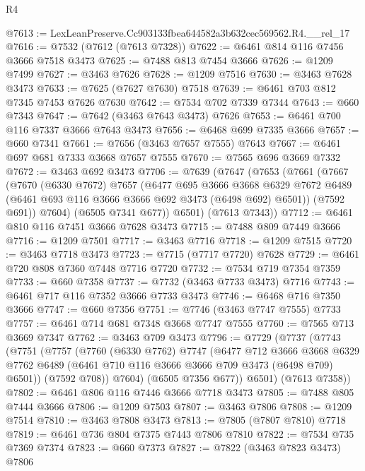 \begin{lexlean}{R4}
\begin{coremodule}
@7613 := LexLeanPreserve.Cc903133fbea644582a3b632cec569562.R4.__rel_17
@7616 := @7532 (@7612 (@7613 @7328))
@7622 := @6461 @814 @116 @7456 @3666 @7518 @3473
@7625 := @7488 @813 @7454 @3666
@7626 := @1209 @7499
@7627 := @3463 @7626
@7628 := @1209 @7516
@7630 := @3463 @7628 @3473
@7633 := @7625 (@7627 @7630) @7518
@7639 := @6461 @703 @812 @7345 @7453 @7626 @7630
@7642 := @7534 @702 @7339 @7344
@7643 := @660 @7343
@7647 := @7642 (@3463 @7643 @3473) @7626
@7653 := @6461 @700 @116 @7337 @3666 @7643 @3473
@7656 := @6468 @699 @7335 @3666
@7657 := @660 @7341
@7661 := @7656 (@3463 @7657 @7555) @7643
@7667 := @6461 @697 @681 @7333 @3668 @7657 @7555
@7670 := @7565 @696 @3669 @7332
@7672 := @3463 @692 @3473
@7706 := @7639
    (@7647
      (@7653
        (@7661
          (@7667
            (@7670
              (@6330 @7672)
              @7657
              (@6477
                @695
                @3666
                @3668
                @6329
                @7672
                @6489
                (@6461 @693 @116 @3666 @3666 @692 @3473 (@6498 @692) @6501))
              (@7592 @691))
            @7604)
          (@6505 @7341 @677))
        @6501)
      (@7613 @7343))
@7712 := @6461 @810 @116 @7451 @3666 @7628 @3473
@7715 := @7488 @809 @7449 @3666
@7716 := @1209 @7501
@7717 := @3463 @7716
@7718 := @1209 @7515
@7720 := @3463 @7718 @3473
@7723 := @7715 (@7717 @7720) @7628
@7729 := @6461 @720 @808 @7360 @7448 @7716 @7720
@7732 := @7534 @719 @7354 @7359
@7733 := @660 @7358
@7737 := @7732 (@3463 @7733 @3473) @7716
@7743 := @6461 @717 @116 @7352 @3666 @7733 @3473
@7746 := @6468 @716 @7350 @3666
@7747 := @660 @7356
@7751 := @7746 (@3463 @7747 @7555) @7733
@7757 := @6461 @714 @681 @7348 @3668 @7747 @7555
@7760 := @7565 @713 @3669 @7347
@7762 := @3463 @709 @3473
@7796 := @7729
    (@7737
      (@7743
        (@7751
          (@7757
            (@7760
              (@6330 @7762)
              @7747
              (@6477
                @712
                @3666
                @3668
                @6329
                @7762
                @6489
                (@6461 @710 @116 @3666 @3666 @709 @3473 (@6498 @709) @6501))
              (@7592 @708))
            @7604)
          (@6505 @7356 @677))
        @6501)
      (@7613 @7358))
@7802 := @6461 @806 @116 @7446 @3666 @7718 @3473
@7805 := @7488 @805 @7444 @3666
@7806 := @1209 @7503
@7807 := @3463 @7806
@7808 := @1209 @7514
@7810 := @3463 @7808 @3473
@7813 := @7805 (@7807 @7810) @7718
@7819 := @6461 @736 @804 @7375 @7443 @7806 @7810
@7822 := @7534 @735 @7369 @7374
@7823 := @660 @7373
@7827 := @7822 (@3463 @7823 @3473) @7806

\end{coremodule}
\end{lexlean}
